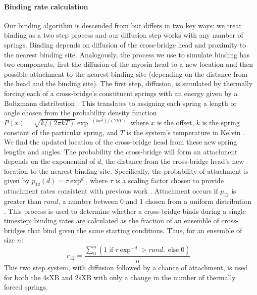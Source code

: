 \documentclass[]{article}
\begin{document}
\paragraph{Binding rate calculation} %
Our binding algorithm is descended from \citet{Tanner2007} but differs in two key ways: we treat binding as a two step process and our diffusion step works with any number of springs.
Binding depends on diffusion of the cross-bridge head and proximity to the nearest binding site.
Analogously, the process we use to simulate binding has two components, first the diffusion of the myosin head to a new location and then possible attachment to the nearest binding site (depending on the distance from the head and the binding site).
The first step, diffusion, is simulated by thermally forcing each of a cross-bridge's constituent springs with an energy given by a Boltzmann distribution \citep{BergBook, HowardBook}.
This translates to assigning each spring a length or angle chosen from the probability density function $P(x) = \sqrt{k / (2 \pi kT)} \exp^{-(k x^2)/(2 kT)}$ where $x$ is the offset, $k$ is the spring constant of the particular spring, and $T$ is the system's temperature in Kelvin  \citep{DillBook, HowardBook}.
We find the updated location of the cross-bridge head from these new spring lengths and angles.
The probability the cross-bridge will form an attachment depends on the exponential of $d$, the distance from the cross-bridge head's new location to the nearest binding site.
Specifically, the probability of attachment is given by $p_{12}(d) = \tau \exp ^{d}$, where $\tau$ is a scaling factor chosen to provide attachment rates consistent with previous work \citep{Daniel1998, Tanner2007}.
Attachment occurs if $p_{12}$ is greater than $rand$, a number between 0 and 1 chosen from a uniform distribution \citep{Tanner2007}.
This process is used to determine whether a cross-bridge binds during a single timestep; binding rates are calculated as the fraction of an ensemble of cross-bridges that bind given the same starting conditions. 
Thus, for an ensemble of size $n$: 
$$r_{12} =  \frac{\sum_0^n \left( 1\; \textrm{if}\; \tau \exp^{-d}>rand ,\; \textrm{else}\; 0 \right)}{n}$$
This two step system, with diffusion followed by a chance of attachment, is used for both the 4sXB and 2sXB with only a change in the number of thermally forced springs.
\end{document}
